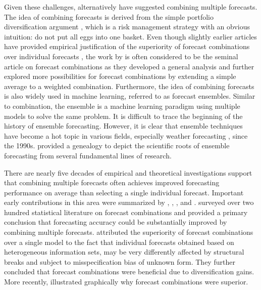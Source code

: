 \documentclass[11pt]{article}
\begin{document}
Given these challenges, alternatively \cite{Bates1969-yj} have suggested combining multiple forecasts. The idea of combining forecasts is derived from the simple portfolio diversification argument \citep{Timmermann2006-en}, which is a risk management strategy with an obvious intuition: do not put all eggs into one basket. Even though slightly earlier articles have provided empirical justification of the superiority of forecast combinations over individual forecasts \citep[e.g.,][]{Barnard1963-xa,crane1967two}, the work by \cite{Bates1969-yj} is often considered to be the seminal article on forecast combinations as they developed a general analysis and further explored more possibilities for forecast combinations by extending a simple average to a weighted combination. Furthermore, the idea of combining forecasts is also widely used in machine learning, referred to as forecast ensembles. Similar to combination, the ensemble is a machine learning paradigm using multiple models to solve the same problem. It is difficult to trace the beginning of the history of ensemble forecasting. However, it is clear that ensemble techniques have become a hot topic in various fields, especially weather forecasting \cite[see an overview by][]{Leutbecher2008-mc}, since the 1990s. \cite{Lewis2005-hu} provided a genealogy to depict the scientific roots of ensemble forecasting from several fundamental lines of research.

There are nearly five decades of empirical and theoretical investigations support that combining multiple forecasts often achieves improved forecasting performance on average than selecting a single individual forecast. Important early contributions in this area were summarized by \cite{Granger1989-gv}, \cite{Clemen1989-fb}, \cite{Palm1992-im}, and \cite{Timmermann2006-en}. \cite{Clemen1989-fb} surveyed over two hundred statistical literature on forecast combinations and provided a primary conclusion that forecasting accuracy could be substantially improved by combining multiple forecasts. \cite{Timmermann2006-en} attributed the superiority of forecast combinations over a single model to the fact that individual forecasts obtained based on heterogeneous information sets, may be very differently affected by structural breaks and subject to misspecification bias of unknown form. They further concluded that forecast combinations were beneficial due to diversification gains. More recently, \cite{Atiya2020-ge} illustrated graphically why forecast combinations were superior.
\end{document}
